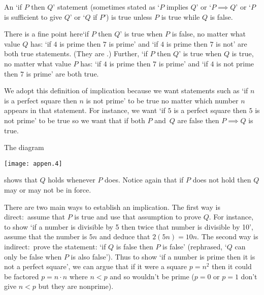 An `if \( P \) then \( Q \)' statement (sometimes stated as
`\( P \) implies \( Q \)' or `\( P\implies Q\)' or 
`\( P \) is sufficient to give \( Q \)' or `$Q$ if $P$') 
is true unless \( P \) is true while \( Q \) is false.

There is a fine point here\Dash `if \( P \) then \( Q \)' is
true when \( P \) is false, no matter what value $Q$ has:
`if \( 4 \) is prime then \( 7 \) is prime' and
`if \( 4 \) is prime then \( 7 \) is not' are both true statements.
(They are .)
Further, `if \( P \) then \( Q \)' is true when $Q$ is true, no matter 
what value $P$ has: `if $4$ is prime then $7$ is prime' and 
`if $4$ is not prime then $7$ is prime' are both true.

We adopt this definition of implication
because we want statements 
such as `if $n$ is a perfect square then $n$ is not prime'
to be true no matter which 
number $n$ appears in that statement.
For instance, we want `if $5$ is a perfect square then $5$ is not prime'
to be true so we want that if both $P$ and~$Q$ are false then
$P\implies Q$ is true.

The diagram
\begin{center}
  \texttt{[image: appen.4]}
\end{center}
shows that \( Q \) holds whenever \( P \) does.
Notice again that if \( P \) does not hold then \( Q \) may or may not
be in force.

There are two main ways to establish an implication.
The first way is direct:~assume that \( P \) is true and use that
assumption to prove \( Q \).
For instance,
to show `if a number is divisible by 5 then twice that
number is divisible by 10', assume that the number is \( 5n \) and
deduce that \( 2(5n)=10n \).
The second way is indirect:~prove the 
statement: `if \( Q \) is false then \( P \) is false'
(rephrased, `\( Q \) can only be false when \( P \) is also false').
Thus to show `if a number is prime then it
is not a perfect square', we can 
argue that if it were a square \( p=n^2 \) then it could be
factored \( p=n\cdot n \) where \( n<p \) and so wouldn't be prime
(\( p=0 \) or \( p=1 \) don't give \( n<p \) but they
are nonprime).

